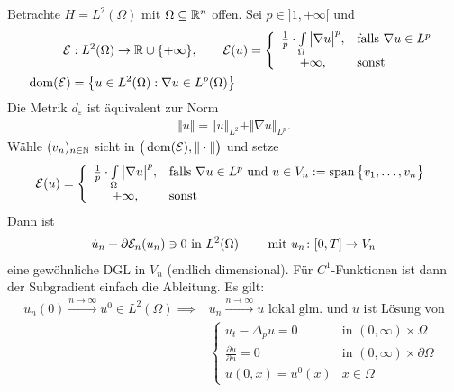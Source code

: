 \begin{beispiel}
	 Betrachte $H=L^2(\Omega)$ mit $\Omega\subseteq\mathbb{R}^n$ offen.
	 Sei $p\in]1,+\infty[$ und 
	 \begin{align*}
	 	\mathcal{E}&:L^2(\Omega)\to\mathbb{R}\cup\lbrace+\infty\rbrace,\qquad
	 	\mathcal{E}(u)=\left\lbrace\begin{array}{cl}
	 		\frac{1}{p}\cdot\int\limits_\Omega\big|\nabla u\big|^p, &\text{falls } \nabla u\in L^p\\
	 		+\infty, &\text{sonst }
	 	\end{array}\right.\\
	 	\operatorname{dom}(\mathcal{E})&=\left\lbrace u\in L^2(\Omega):\nabla u\in L^p(\Omega)\right\rbrace
	 \end{align*}
	 Die Metrik $d_\varepsilon$ ist äquivalent zur Norm
	 \begin{align*}
	 	\Vert u\Vert=\Vert u\Vert_{L^2}+\Vert\nabla u\Vert_{L^p}.
	 \end{align*}
	 Wähle $(v_n)_{n\in\mathbb{N}}$ sicht in $\big(\operatorname{dom}(\mathcal{E}),\Vert\cdot\Vert\big)$ und setze
	 \begin{align*}
	 	\mathcal{E}(u)=\left\lbrace\begin{array}{cl}
	 		\frac{1}{p}\cdot\int\limits_\Omega\big|\nabla u\big|^p , &\text{falls } \nabla u\in L^p\text{ und }u\in V_n:=\operatorname{span}\big\lbrace v_1,\ldots,v_n\big\rbrace\\
	 		+\infty, &\text{sonst }
	 	\end{array}\right.
	 \end{align*}
	 Dann ist
	 \begin{align*}
	 	\dot{u}_n+\partial\mathcal{E}_n(u_n)\ni 0\text{ in }L^2(\Omega)
	 	\qquad\text{ mit } u_n\colon [0,T]\to V_n
	 \end{align*}
	 eine gewöhnliche DGL in $V_n$ (endlich dimensional). Für $C^1$-Funktionen ist dann der Subgradient einfach die Ableitung.
	 Es gilt:
	 \begin{align*}
	 	u_n(0)\overset{n\to\infty}{\longrightarrow}u^0\in L^2(\Omega)
	 	\implies &u_n\overset{n\to\infty}{\longrightarrow} u\text{ lokal glm. und $u$ ist Lösung von}\\
	 	&\left\lbrace\begin{array}{rl}
	 		u_t-\Delta_p u =0 &\text{in }(0,\infty)\times\Omega\\
	 		\frac{\partial u}{\partial n}=0 &\text{in }(0,\infty)\times\partial\Omega\\
	 		u(0,x)=u^0(x) &x\in\Omega
	 	\end{array}\right.
	 \end{align*}
\end{beispiel}

